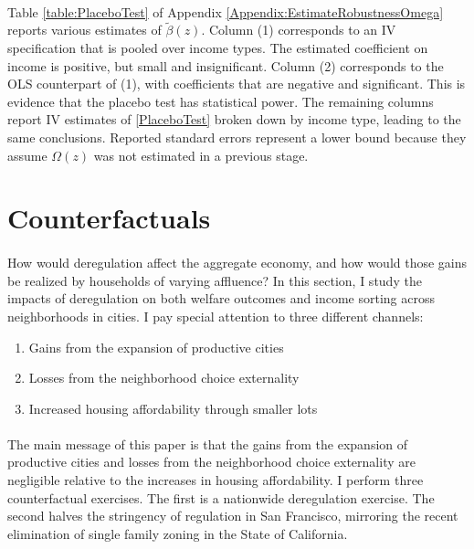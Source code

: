 \documentclass[12pt]{article}
\begin{document}
\paragraph*{}
Table \ref{table:PlaceboTest} of Appendix \ref{Appendix:EstimateRobustnessOmega} reports various estimates of $\tilde{\beta}(z)$. Column (1) corresponds to an IV specification that is pooled over income types. The estimated coefficient on income is positive, but small and insignificant. Column (2) corresponds to the OLS counterpart of (1), with coefficients that are negative and significant. This is evidence that the placebo test has statistical power. The remaining columns report IV estimates of \eqref{PlaceboTest} broken down by income type, leading to the same conclusions. Reported standard errors represent a lower bound because they assume $\Omega(z)$ was not estimated in a previous stage. 



\section{Counterfactuals}\label{Section:Counterfactuals}
\paragraph{}
How would deregulation affect the aggregate economy, and how would those gains be realized by households of varying affluence? In this section, I study the impacts of deregulation on both welfare outcomes and income sorting across neighborhoods in cities. I pay special attention to three different channels:

\begin{enumerate}
	\item Gains from the expansion of productive cities \citep{hseihmoretti, durantonpugaurbgrowth}
	
	\item Losses from the neighborhood choice externality \citep{hamilton1976, calabresetal}
	
	\item Increased housing affordability through smaller lots \citep{Song, kulka}
\end{enumerate}

\paragraph*{}
The main message of this paper is that the gains from the expansion of productive cities and losses from the neighborhood choice externality are negligible relative to the increases in housing affordability. I perform three counterfactual exercises. The first is a nationwide deregulation exercise. The second halves the stringency of regulation in San Francisco, mirroring the recent elimination of single family zoning in the State of California. 
\end{document}
